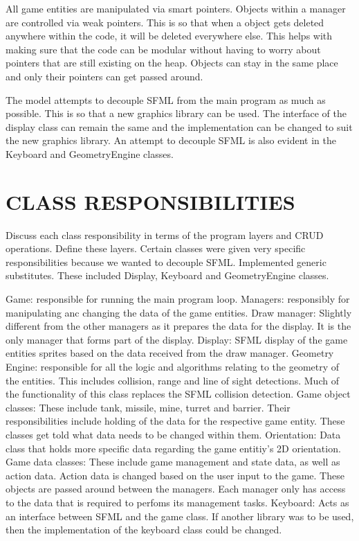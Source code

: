 \documentclass[10pt,twocolumn]{witseiepaper}
\begin{document}
All game entities are manipulated via smart pointers. Objects within a manager are controlled via weak pointers. This is so that when a object gets deleted anywhere within the code, it will be deleted everywhere else. This helps with making sure that the code can be modular without having to worry about pointers that are still existing on the heap. Objects can stay in the same place and only their pointers can get passed around.

The model attempts to decouple SFML from the main program as much as possible. This is so that a new graphics library can be used. The interface of the display class can remain the same and the implementation can be changed to suit the new graphics library. An attempt to decouple SFML is also evident in the Keyboard and GeometryEngine classes. 


%
\section{CLASS RESPONSIBILITIES}
Discuss each class responsibility in terms of the program layers and CRUD operations. Define these layers. Certain classes were given very specific responsibilities because we wanted to decouple SFML. Implemented generic substitutes. These included Display, Keyboard and GeometryEngine classes. 

Game: responsible for running the main program loop.
Managers: responsibly for manipulating anc changing the data of the game entities.
Draw manager: Slightly different from the other managers as it prepares the data for the display. It is the only manager that forms part of the display.
Display: SFML display of the game entities sprites based on the data received from the draw manager.
Geometry Engine: responsible for all the logic and algorithms relating to the geometry of the entities. This includes collision, range and line of sight detections. Much of the functionality of this class replaces the SFML collision detection. 
Game object classes: These include tank, missile, mine, turret and barrier. Their responsibilities include holding of the data for the respective game entity. These classes get told what data needs to be changed within them.
Orientation: Data class that holds more specific data regarding the game entitiy's 2D orientation.
Game data classes: These include game management and state data, as well as action data. Action data is changed based on the user input to the game. These objects are passed around between the managers. Each manager only has access to the data that is required to perfoms its management tasks.
Keyboard: Acts as an interface between SFML and the game class. If another library was to be used, then the implementation of the keyboard class could be changed.
\end{document}
